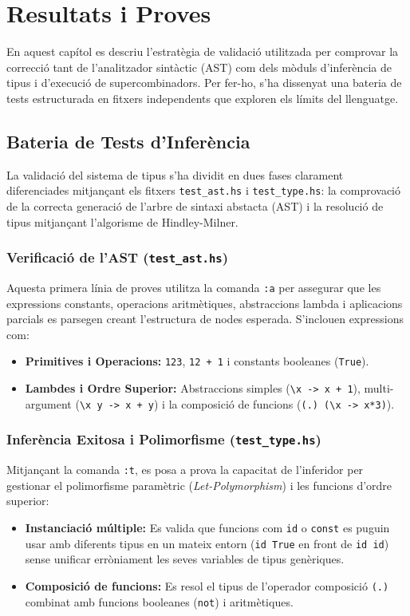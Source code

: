 \chapter{Resultats i Proves}

En aquest capítol es descriu l'estratègia de validació utilitzada per comprovar la correcció tant de l'analitzador sintàctic (AST) com dels mòduls d'inferència de tipus i d'execució de supercombinadors. Per fer-ho, s'ha dissenyat una bateria de tests estructurada en fitxers independents que exploren els límits del llenguatge.

\section{Bateria de Tests d'Inferència}

La validació del sistema de tipus s'ha dividit en dues fases clarament diferenciades mitjançant els fitxers \texttt{test\_ast.hs} i \texttt{test\_type.hs}: la comprovació de la correcta generació de l'arbre de sintaxi abstacta (AST) i la resolució de tipus mitjançant l'algorisme de Hindley-Milner.

\subsection{Verificació de l'AST (\texttt{test\_ast.hs})}
Aquesta primera línia de proves utilitza la comanda \texttt{:a} per assegurar que les expressions constants, operacions aritmètiques, abstraccions lambda i aplicacions parcials es parsegen creant l'estructura de nodes esperada. S'inclouen expressions com:
\begin{itemize}
    \item \textbf{Primitives i Operacions:} \texttt{123}, \texttt{12 + 1} i constants booleanes (\texttt{True}).
    \item \textbf{Lambdes i Ordre Superior:} Abstraccions simples (\texttt{\textbackslash x -> x + 1}), multi-argument (\texttt{\textbackslash x y -> x + y}) i la composició de funcions (\texttt{(.) (\textbackslash x -> x*3)}).
\end{itemize}

\subsection{Inferència Exitosa i Polimorfisme (\texttt{test\_type.hs})}
Mitjançant la comanda \texttt{:t}, es posa a prova la capacitat de l'inferidor per gestionar el polimorfisme paramètric (\emph{Let-Polymorphism}) i les funcions d'ordre superior:
\begin{itemize}
    \item \textbf{Instanciació múltiple:} Es valida que funcions com \texttt{id} o \texttt{const} es puguin usar amb diferents tipus en un mateix entorn (\texttt{id True} en front de \texttt{id id}) sense unificar erròniament les seves variables de tipus genèriques.
    \item \textbf{Composició de funcions:} Es resol el tipus de l'operador composició \texttt{(.)} combinat amb funcions booleanes (\texttt{not}) i aritmètiques.
\end{itemize}

